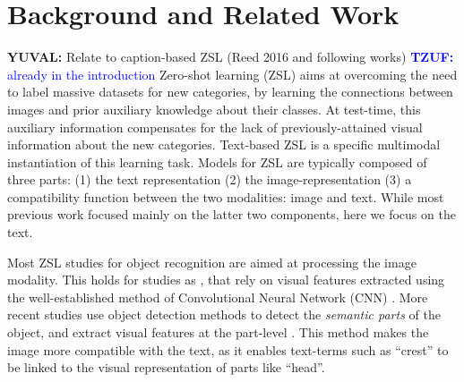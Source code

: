 \documentclass[11pt,a4paper]{article}
\newcommand\yuval[1]{\textcolor{darkpink}{\textbf{YUVAL:} #1 }}
\newcommand\tzuf[1]{\textcolor{blue}{\textbf{TZUF:} #1 }}
\newcommand\reut[1]{\textcolor{green}{\textbf{REUT:} #1 }}
\begin{document}
\section{Background and Related Work}
\yuval{Relate to caption-based ZSL (Reed 2016 and following works)} \tzuf{already in the introduction}
Zero-shot learning (ZSL) %
aims at overcoming the need to label massive datasets for new categories, by learning the connections between images and prior auxiliary knowledge about their classes. At test-time, this auxiliary information compensates for the lack of previously-attained visual information about  the new categories.
Text-based ZSL is a specific multimodal instantiation of this learning task. Models for ZSL are typically composed of three parts: (1) the text representation (2) the image-representation (3) a compatibility function between the two modalities: image and text.   While most previous work focused mainly on the latter two components, here we %
focus on the text.  

Most ZSL  studies   for object recognition are aimed at processing  the image modality. This holds for studies as \citet{xu2018attngan,lei2015predicting,qiao2016less,akata2016multi}, that rely on visual features  extracted using the well-established method of
Convolutional Neural Network (CNN) \cite{lecun1995convolutional}. More recent studies use object detection methods to detect the {\em semantic parts} of the object, and extract visual features at the part-level \cite{elhoseiny2017link,zhu2018generative,zhang2016spda}. This
method makes the image more compatible with the text, as it enables text-terms such as \enquote{crest} to be linked to the visual representation of parts like \enquote{head}. 
\end{document}
